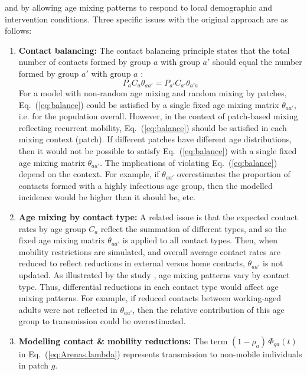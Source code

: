 and by allowing age mixing patterns to respond to local demographic and intervention conditions.
Three specific issues with the original approach are as follows:
\begin{enumerate}
  \item \textbf{Contact balancing:}\label{issue:balance}
  The contact balancing principle states that
  the total number of contacts formed by group $a$ with group $a'$
  should equal the number formed by group $a'$ with group $a$ \cite{Arregui2018}:
  \begin{equation}\label{eq:balance}
    P_{a} C_{a} \theta_{aa'} = P_{a'} C_{a'} \theta_{a'a}
  \end{equation}
  For a model with non-random age mixing and random mixing by patches,
  Eq.~(\ref{eq:balance}) could be satisfied by a single fixed age mixing matrix $\theta_{aa'}$,
  i.e. for the population overall.
  However, in the context of patch-based mixing reflecting recurrent mobility,
  Eq.~(\ref{eq:balance}) should be satisfied in each mixing context (patch).
  If different patches have different age distributions,
  then it would not be possible to satisfy Eq.~(\ref{eq:balance})
  with a single fixed age mixing matrix $\theta_{aa'}$.
  The implications of violating Eq.~(\ref{eq:balance}) depend on the context.
  For example, if $\theta_{aa'}$ overestimates
  the proportion of contacts formed with a highly infectious age group,
  then the modelled incidence would be higher than it should be, etc.
  \item \textbf{Age mixing by contact type:}\label{issue:age-mix}
  A related issue is that the expected contact rates by age group $C_a$ reflect
  the summation of different types,
  and so the fixed age mixing matrix $\theta_{aa'}$ is applied to all contact types.
  Then, when mobility restrictions are simulated,
  and overall average contact rates are reduced to reflect reductions in external versus home contacts,
  $\theta_{aa'}$ is not updated.
  As illustrated by the \polymod study \cite{Mossong2008}, age mixing patterns vary by contact type.
  Thus, differential reductions in each contact type would affect age mixing patterns.
  For example, if reduced contacts between working-aged adults were not reflected in $\theta_{aa'}$,
  then the relative contribution of this age group to transmission could be overestimated.
  \item \textbf{Modelling contact \& mobility reductions:}\label{issue:mobility}
  The term $(1-\rho_a)\,\Phi_{ga}(t)$ in Eq.~(\ref{eq:Arenas.lambda})
  represents transmission to non-mobile individuals in patch $g$.

\end{enumerate}
